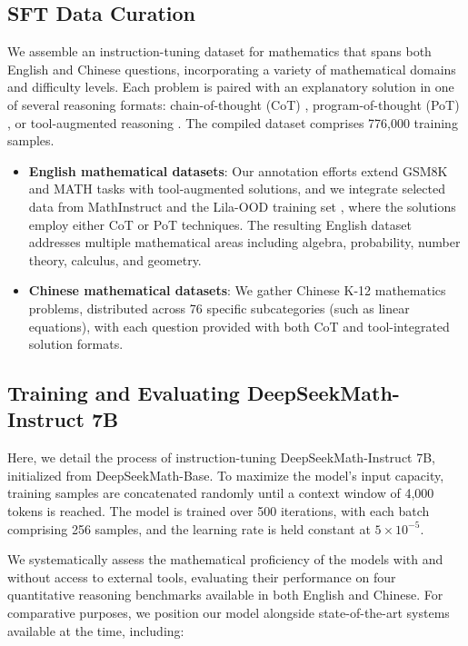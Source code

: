 \subsection{SFT Data Curation}

We assemble an instruction-tuning dataset for mathematics that spans both English and Chinese questions, incorporating a variety of mathematical domains and difficulty levels. Each problem is paired with an explanatory solution in one of several reasoning formats: chain-of-thought (CoT) \citep{cot}, program-of-thought (PoT) \citep{pot,pal}, or tool-augmented reasoning \citep{tora}. The compiled dataset comprises 776,000 training samples.

\begin{itemize}[topsep=0pt]
    \item \textbf{English mathematical datasets}: Our annotation efforts extend GSM8K and MATH tasks with tool-augmented solutions, and we integrate selected data from MathInstruct \citep{MathInstruct} and the Lila-OOD training set \citep{lila}, where the solutions employ either CoT or PoT techniques. The resulting English dataset addresses multiple mathematical areas including algebra, probability, number theory, calculus, and geometry.
    \item \textbf{Chinese mathematical datasets}: We gather Chinese K-12 mathematics problems, distributed across 76 specific subcategories (such as linear equations), with each question provided with both CoT and tool-integrated solution formats.
\end{itemize}

\subsection{Training and Evaluating DeepSeekMath-Instruct 7B}

Here, we detail the process of instruction-tuning DeepSeekMath-Instruct 7B, initialized from DeepSeekMath-Base. To maximize the model’s input capacity, training samples are concatenated randomly until a context window of 4,000 tokens is reached. The model is trained over 500 iterations, with each batch comprising 256 samples, and the learning rate is held constant at $5 \times 10^{-5}$.

We systematically assess the mathematical proficiency of the models with and without access to external tools, evaluating their performance on four quantitative reasoning benchmarks available in both English and Chinese. For comparative purposes, we position our model alongside state-of-the-art systems available at the time, including:

